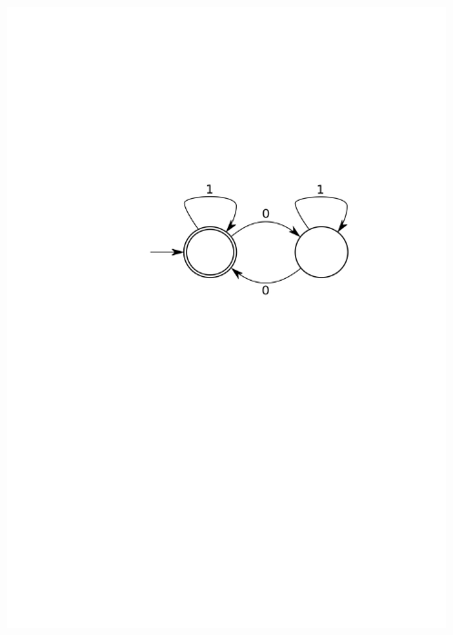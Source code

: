 \documentclass[]{beamer}
\begin{document}
\begin{frame}
  \begin{columns}
    \begin{column}{0.5\textwidth}
      \includegraphics[width=\textwidth]{images/1_seminar_even_num_zeroes}    
    \end{column}    
    \begin{column}{0.5\textwidth}

\end{column}
\end{columns}
\end{frame}
\end{document}
